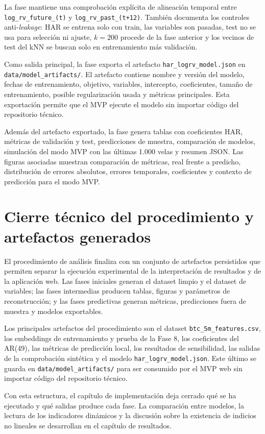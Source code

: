 La fase mantiene una comprobación explícita de alineación temporal entre \texttt{log\_\allowbreak rv\_\allowbreak future\_(t)} y \texttt{log\_\allowbreak rv\_\allowbreak past\_(t+12)}. También documenta los controles anti-\textit{leakage}: HAR se entrena solo con train, las variables son pasadas, test no se usa para selección ni ajuste, \(k=200\) procede de la fase anterior y los vecinos de test del kNN se buscan solo en entrenamiento más validación.

Como salida principal, la fase exporta el artefacto \texttt{har\_\allowbreak logrv\_\allowbreak model.json} en \texttt{data/\allowbreak model\_\allowbreak artifacts/}. El artefacto contiene nombre y versión del modelo, fechas de entrenamiento, objetivo, variables, intercepto, coeficientes, tamaño de entrenamiento, posible regularización usada y métricas principales. Esta exportación permite que el MVP ejecute el modelo sin importar código del repositorio técnico.

Además del artefacto exportado, la fase genera tablas con coeficientes HAR, métricas de validación y test, predicciones de muestra, comparación de modelos, simulación del modo MVP con las últimas 1.000 velas y resumen JSON. Las figuras asociadas muestran comparación de métricas, real frente a predicho, distribución de errores absolutos, errores temporales, coeficientes y contexto de predicción para el modo MVP.

\section{Cierre técnico del procedimiento y artefactos generados}\label{sec}

El procedimiento de análisis finaliza con un conjunto de artefactos persistidos que permiten separar la ejecución experimental de la interpretación de resultados y de la aplicación web. Las fases iniciales generan el dataset limpio y el dataset de variables; las fases intermedias producen tablas, figuras y parámetros de reconstrucción; y las fases predictivas generan métricas, predicciones fuera de muestra y modelos exportables.

Los principales artefactos del procedimiento son el dataset \texttt{btc\_\allowbreak 5m\_\allowbreak features.csv}, los embeddings de entrenamiento y prueba de la Fase 8, los coeficientes del AR(49), las métricas de predicción local, los resultados de sensibilidad, las salidas de la comprobación sintética y el modelo \texttt{har\_\allowbreak logrv\_\allowbreak model.json}. Este último se guarda en \texttt{data/\allowbreak model\_\allowbreak artifacts/} para ser consumido por el MVP web sin importar código del repositorio técnico.

Con esta estructura, el capítulo de implementación deja cerrado qué se ha ejecutado y qué salidas produce cada fase. La comparación entre modelos, la lectura de los indicadores dinámicos y la discusión sobre la existencia de indicios no lineales se desarrollan en el capítulo de resultados.